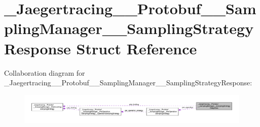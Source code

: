 \hypertarget{struct__Jaegertracing____Protobuf____SamplingManager____SamplingStrategyResponse}{}\section{\+\_\+\+Jaegertracing\+\_\+\+\_\+\+Protobuf\+\_\+\+\_\+\+Sampling\+Manager\+\_\+\+\_\+\+Sampling\+Strategy\+Response Struct Reference}
\label{struct__Jaegertracing____Protobuf____SamplingManager____SamplingStrategyResponse}


Collaboration diagram for \+\_\+\+Jaegertracing\+\_\+\+\_\+\+Protobuf\+\_\+\+\_\+\+Sampling\+Manager\+\_\+\+\_\+\+Sampling\+Strategy\+Response\+:
\nopagebreak
\begin{figure}[H]
\begin{center}
\leavevmode
\includegraphics[width=350pt]{struct__Jaegertracing____Protobuf____SamplingManager____SamplingStrategyResponse__coll__graph}
\end{center}
\end{figure}
